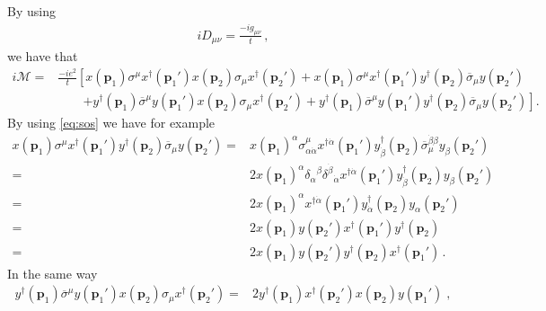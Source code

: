 By using
\begin{align}
  iD_{\mu\nu}=\frac{-ig_{\mu\nu}}{t}\,,
\end{align}
we have that
\begin{align}
    i\mathcal{M}=&\frac{-ie^2}{t}\left[ x(\mathbf{p}_1) {\sigma}^{\mu}x^{\dagger}(\mathbf{p}_1')x(\mathbf{p}_2) {\sigma}_{\mu}x^{\dagger}(\mathbf{p}_2')+x(\mathbf{p}_1) {\sigma}^{\mu}x^{\dagger}(\mathbf{p}_1')y^{\dagger}(\mathbf{p}_2) \overline{\sigma}_{\mu} y(\mathbf{p}_2') \right.   \nonumber\\
&\qquad \left.+ y^{\dagger}(\mathbf{p}_1) \overline{\sigma}^{\mu} y(\mathbf{p}_1')x(\mathbf{p}_2) {\sigma}_{\mu}x^{\dagger}(\mathbf{p}_2') +
y^{\dagger}(\mathbf{p}_1) \overline{\sigma}^{\mu} y(\mathbf{p}_1')y^{\dagger}(\mathbf{p}_2) \overline{\sigma}_{\mu} y(\mathbf{p}_2')\right].
\end{align}
By using \eqref{eq:sos} we have for example
\begin{align}
x(\mathbf{p}_1) {\sigma}^{\mu}x^{\dagger}(\mathbf{p}_1')y^{\dagger}(\mathbf{p}_2) \overline{\sigma}_{\mu} y(\mathbf{p}_2')=&  x(\mathbf{p}_1)^{\alpha} {\sigma}^{\mu}_{\alpha\dot{\alpha}}x^{\dagger\dot{\alpha}}(\mathbf{p}_1')y^{\dagger}_{\dot{\beta}}(\mathbf{p}_2) \overline{\sigma}_{\mu}^{\dot{\beta}\beta} y_{\beta}(\mathbf{p}_2') \nonumber\\
 =&  2x(\mathbf{p}_1)^{\alpha}{\delta_{\alpha}}^{\beta}{\delta^{\dot{\beta}}}_{\dot{\alpha}} x^{\dagger\dot{\alpha}}(\mathbf{p}_1')y^{\dagger}_{\dot{\beta}}(\mathbf{p}_2)  y_{\beta}(\mathbf{p}_2') \nonumber\\
 =&  2x(\mathbf{p}_1)^{\alpha} x^{\dagger\dot{\alpha}}(\mathbf{p}_1')y^{\dagger}_{\dot{\alpha}}(\mathbf{p}_2)  y_{\alpha}(\mathbf{p}_2') \nonumber\\
 =&  2x(\mathbf{p}_1)y(\mathbf{p}_2') x^{\dagger}(\mathbf{p}_1')y^{\dagger}(\mathbf{p}_2)\nonumber\\
 =&  2x(\mathbf{p}_1)y(\mathbf{p}_2') y^{\dagger}(\mathbf{p}_2)x^{\dagger}(\mathbf{p}_1')\,.
\end{align}
In the same way
\begin{align}
  y^{\dagger}(\mathbf{p}_1) \overline{\sigma}^{\mu} y(\mathbf{p}_1')x(\mathbf{p}_2) {\sigma}_{\mu}x^{\dagger}(\mathbf{p}_2')=&
2y^{\dagger}(\mathbf{p}_1)x^{\dagger}(\mathbf{p}_2')x(\mathbf{p}_2)y(\mathbf{p}_1') \;,
\end{align}
